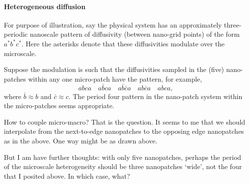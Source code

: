 \documentclass[10pt,a4paper]{article}
\begin{document}
\paragraph{Heterogeneous diffusion}
For purpose of illustration, say the physical system has an approximately three-periodic nanoscale pattern of diffusivity (between nano-grid points) of the form \(a^*b^*c^*\).
Here the asterisks denote that these diffusivities modulate over the microscale.

Suppose the modulation is such that the diffusivities sampled in the (five) nano-patches within any one micro-patch have the pattern, for example,
\begin{equation*}
abca \quad
a\bar bca \quad
a\bar b\bar ca \quad
ab\bar ca \quad
abca,
\end{equation*}
where \(\bar b\approx b\) and \(\bar c\approx c\).
The period four pattern in the nano-patch system within the micro-patches seems appropriate.

How to couple micro-macro?  That is the question.
It seems to me that we should interpolate from the next-to-edge nanopatches to the opposing edge nanopatches as in the above.
One way might be as drawn above.

But I am have further thoughts: with only five nanopatches, perhaps the period of the microscale heterogeneity should be three nanopatches `wide', not the four that I posited above.  In which case, what?
\end{document}
